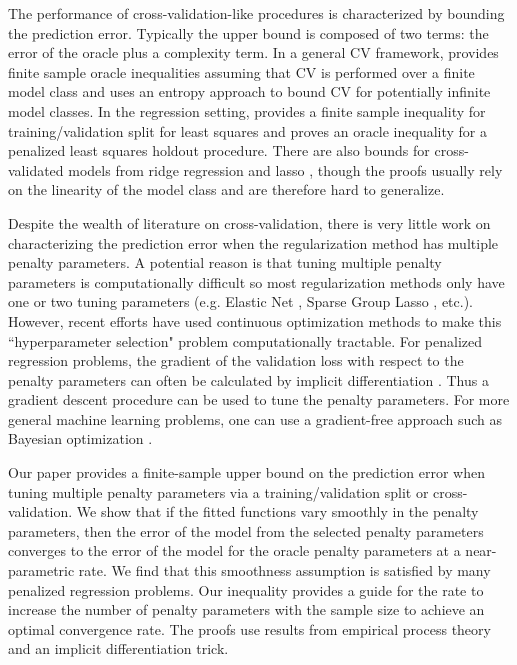 \documentclass[12pt]{article}
\begin{document}
The performance of cross-validation-like procedures is characterized by bounding the prediction error. Typically the upper bound is composed of two terms: the error of the oracle plus a complexity term. In a general CV framework, \citet{van2003unified, van2004asymptotic} provides finite sample oracle inequalities assuming that CV is performed over a finite model class and \citet{lecue2012oracle} uses an entropy approach to bound CV for potentially infinite model classes. In the regression setting, \citet{gyorfi2006distribution} provides a finite sample inequality for training/validation split for least squares and \citet{wegkamp2003model} proves an oracle inequality for a penalized least squares holdout procedure. There are also bounds for cross-validated models from ridge regression and lasso \citep{golub1979generalized, chetverikov2016cross, chatterjee2015prediction}, though the proofs usually rely on the linearity of the model class and are therefore hard to generalize.

Despite the wealth of literature on cross-validation, there is very little work on characterizing the prediction error when the regularization method has multiple penalty parameters. A potential reason is that tuning multiple penalty parameters is computationally difficult so most regularization methods only have one or two tuning parameters (e.g. Elastic Net \citep{zou2003regression}, Sparse Group Lasso \citep{simon2013sparse}, etc.). However, recent efforts have used continuous optimization methods to make this ``hyperparameter selection" problem computationally tractable. For penalized regression problems, the gradient of the validation loss with respect to the penalty parameters can often be calculated by implicit differentiation \citep{bengio2000gradient, foo2008efficient}. Thus a gradient descent procedure can be used to tune the penalty parameters. For more general machine learning problems, one can use a gradient-free approach such as Bayesian optimization \citet{snoek2012practical}.

Our paper provides a finite-sample upper bound on the prediction error when tuning multiple penalty parameters via a training/validation split or cross-validation. We show that if the fitted functions vary smoothly in the penalty parameters, then the error of the model from the selected penalty parameters converges to the error of the model for the oracle penalty parameters at a near-parametric rate. We find that this smoothness assumption is satisfied by many penalized regression problems. Our inequality provides a guide for the rate to increase the number of penalty parameters with the sample size to achieve an optimal convergence rate. The proofs use results from empirical process theory and an implicit differentiation trick.
\end{document}
